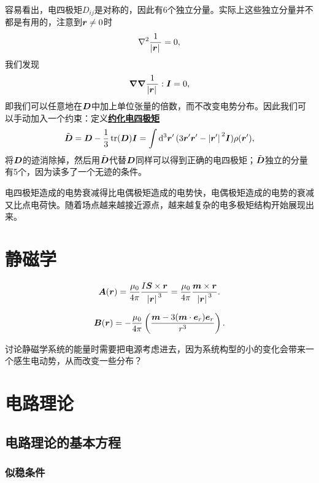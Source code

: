 \documentclass[UTF8, a4paper]{ctexart}
\newcommand*{\concept}[1]{\underline{\textbf{#1}}}
\begin{document}
容易看出，电四极矩$D_{ij}$是对称的，因此有6个独立分量。实际上这些独立分量并不都是有用的，注意到$\vb*{r} \neq 0$时
\[
    \laplacian{\frac{1}{\abs*{\vb*{r}}}} = 0,
\]
我们发现
\[
    \grad{\grad{\frac{1}{\abs*{\vb*{r}}}}} : \vb*{I} = 0,
\]
即我们可以任意地在$\vb*{D}$中加上单位张量的倍数，而不改变电势分布。因此我们可以手动加入一个约束：定义\concept{约化电四极矩}
\begin{equation}
    \tilde{\vb*{D}} = \vb*{D} - \frac{1}{3} \trace(\vb*{D}) \vb*{I} = \int \dd[3]{\vb*{r}'} (3 \vb*{r}' \vb*{r}' - \abs*{\vb*{r}'}^2 \vb*{I}) \rho(\vb*{r}') ,
\end{equation}
将$\vb*{D}$的迹消除掉，然后用$\tilde{\vb*{D}}$代替$\vb*{D}$同样可以得到正确的电四极矩；$\tilde{\vb*{D}}$独立的分量有5个，因为读多了一个无迹的条件。

电四极矩造成的电势衰减得比电偶极矩造成的电势快，电偶极矩造成的电势的衰减又比点电荷快。随着场点越来越接近源点，越来越复杂的电多极矩结构开始展现出来。

\section{静磁学}

\begin{equation}
    \vb*{A}(\vb*{r}) = \frac{\mu_0}{4\pi} \frac{I \vb*{S} \times \vb*{r}}{\abs*{\vb*{r}}^3} = \frac{\mu_0}{4\pi} \frac{\vb*{m} \times \vb*{r}}{\abs*{\vb*{r}}^3}.
\end{equation}

\begin{equation}
    \vb*{B}(\vb*{r}) = - \frac{\mu_0}{4\pi} \left( \frac{\vb*{m} - 3 (\vb*{m} \cdot \vb*{e}_r) \vb*{e}_r}{r^3} \right).
\end{equation}

讨论静磁学系统的能量时需要把电源考虑进去，因为系统构型的小的变化会带来一个感生电动势，从而改变一些分布？

\section{电路理论}

\subsection{电路理论的基本方程}

\subsubsection{似稳条件}
\end{document}
